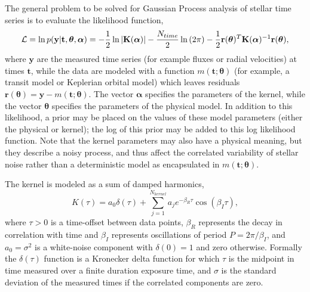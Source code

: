 \documentclass[manuscript, letterpaper]{aastex6}
\makeatletter
\let\origsection\section
\renewcommand\section{\@ifstar{\starsection}{\nostarsection}}
\newcommand\nostarsection[1]{\sectionprelude\origsection{#1}}
\newcommand\starsection[1]{\sectionprelude\origsection*{#1}}
\newcommand\sectionprelude{\vspace{1em}}
\newcommand{\bvec}[1]{{\ensuremath{\boldsymbol{#1}}}}
\makeatother
\begin{document}
\section{Generalized Press-Rybicki}

The general problem to be solved for Gaussian Process analysis of stellar time series is to evaluate
the likelihood function,
\begin{equation}
{\cal{L}} = \ln{p(\mathbf{y}\vert {\mathbf{t},\bvec{\theta}},\bvec{\alpha})} = -\frac{1}{2}\ln{\vert \mathbf{K}(\bvec{\alpha}) \vert}
- \frac{N_{time}}{2} \ln{(2\pi)}
    - \frac{1}{2} {\mathbf r} (\bvec{\theta} ) ^T \mathbf{K}(\bvec{\alpha})^{-1} \mathbf{r}(\bvec{\theta}),
\end{equation}
where $\mathbf{y}$ are the measured time series (for example fluxes or radial velocities) at times
$\mathbf{t}$, while the data are modeled with a function $m(\mathbf{t};\bvec{\theta})$ (for example,
a transit model or Keplerian orbital model) which leaves residuals $\mathbf{r}(\bvec{\theta}) =
\mathbf{y} - m(\mathbf{t};\bvec{\theta})$. %
The vector $\bvec{\alpha}$ specifies the parameters of the kernel, while the vector $\bvec{\theta}$
specifies the parameters of the physical model.  In addition to this likelihood, a prior may be placed on 
the values of these model parameters (either the physical or kernel); the log of this prior may be
added to this log likelihood function.  Note that the kernel
parameters may also have a physical meaning, but they describe a noisy process, and thus affect
the correlated variability of stellar noise rather than a deterministic model as encapsulated in
$m(\mathbf{t};\bvec{\theta})$.

The kernel is modeled as a sum of damped harmonics,
\begin{equation}
K(\tau) = a_0 \delta(\tau) + \sum_{j=1}^{N_{kernel}} a_j e^{-\beta_R \tau} \cos{(\beta_I \tau)},
\end{equation}
where $\tau > 0$ is a time-offset between data points, $\beta_R$ represents the decay 
in correlation with time and $\beta_I$ represents oscillations of period $P = 2\pi/\beta_I$, and
$a_0 = \sigma^2$ is a white-noise component with $\delta(0) = 1$ and zero otherwise.  Formally
the $\delta(\tau)$ function is a Kronecker delta function for which $\tau$ is the midpoint in
time measured over a finite duration exposure time, and $\sigma$ is the standard deviation
of the measured times if the correlated components are zero.
\end{document}
